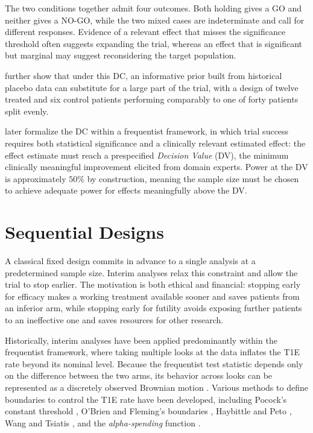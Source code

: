 The two conditions together admit four outcomes. Both holding
gives a GO and neither gives a NO-GO, while the two mixed cases are indeterminate and call for different
responses. Evidence of a relevant effect that misses the significance threshold often suggests expanding the trial, whereas an
effect that is significant but marginal may suggest reconsidering the target population.


\citet{fisch2015bayesian} further show that under this DC, an informative prior built from historical placebo
data can substitute for a large part of the trial, with a design of twelve treated and six control patients performing
comparably to one of forty patients split evenly.


\citet{roychoudhury_beyond_2018} later formalize the DC within a frequentist framework, 
in which trial success requires both statistical significance and a clinically relevant estimated effect: the effect estimate must reach a prespecified \textit{Decision Value} (DV),
the minimum clinically meaningful improvement elicited from domain experts. Power at the DV is approximately $50\%$
by construction, meaning the sample size must be chosen to achieve adequate power for effects meaningfully above the DV.




\section{Sequential Designs}
\label{subsec:sequential_intro}

A classical fixed design commits in advance to a single analysis at a predetermined sample size. Interim analyses relax this constraint and allow the trial to stop earlier. The motivation is both ethical and financial: stopping early for efficacy makes a working
treatment available sooner and saves patients from an inferior arm, while stopping early for futility avoids exposing further patients to an ineffective one and saves resources for other research.

Historically, interim analyses have been applied predominantly within the frequentist framework,
where taking multiple looks at the data inflates the T1E rate beyond its nominal level. Because the frequentist test statistic depends only 
on the difference between the two arms, its behavior across looks can be represented as a discretely observed Brownian 
motion \citep{jennison_group_1999}. Various methods to define boundaries to control the T1E rate have been developed, including Pocock's constant threshold
\citep{pocock_group_1977}, O'Brien and Fleming's boundaries \citep{obrien_multiple_1979}, Haybittle and Peto
\citep{haybittle_repeated_1971, peto_design_1976}, Wang and Tsiatis \citep{wang_approximately_1987}, and the
\textit{alpha-spending} function \citep{lan_demets_discrete_1983}.

